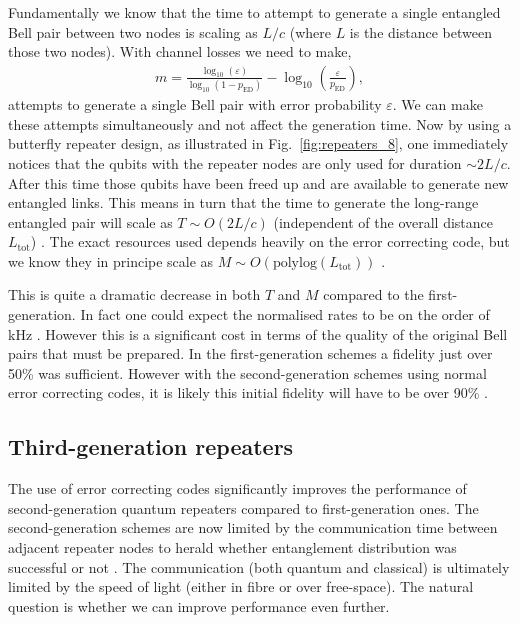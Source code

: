 Fundamentally we know that the time to attempt to generate a single entangled Bell pair between two nodes is scaling as $L/c$ (where $L$ is the distance between those two nodes). With channel losses we need to make,
\begin{align}
m=\frac{\log_{10} (\varepsilon)}{\log_{10} (1-p_\mathrm{ED})} - \log_{10} \left(\frac{\varepsilon}{p_\mathrm{ED}}\right),
\end{align}
attempts to generate a single Bell pair with error probability $\varepsilon$. We can make these attempts simultaneously and not affect the generation time. Now by using a butterfly repeater design, as illustrated in Fig.~\ref{fig:repeaters_8}, one immediately notices that the qubits with the repeater nodes are only used for duration $\sim 2 L/c$. After this time those qubits have been freed up and are available to generate new entangled links. This means in turn that the time to generate the long-range entangled pair will scale as \mbox{$T\sim O(2L/c)$} (independent of the overall distance $L_\mathrm{tot}$) \cite{bib:jiang09, bib:munro10, bib:Muralidharan2016}. The exact resources used depends heavily on the error correcting code, but we know they in principe scale as \mbox{$M \sim O(\mathrm{polylog}(L_\mathrm{tot}))$} \cite{bib:Muralidharan2016}.

This is quite a dramatic decrease in both $T$ and $M$ compared to the first-generation. In fact one could expect the normalised rates to be on the order of kHz \cite{bib:munro10}. However this is a significant cost in terms of the quality of the original Bell pairs that must be prepared. In the first-generation schemes a fidelity just over 50\% was sufficient. However with the second-generation schemes using normal error correcting codes, it is likely this initial fidelity will have to be over 90\% \cite{bib:jiang09, bib:munro10}. 

\subsection{Third-generation repeaters}

The use of error correcting codes significantly improves the performance of second-generation quantum repeaters compared to first-generation ones. The second-generation schemes are now limited by the communication time between adjacent repeater nodes to herald whether entanglement distribution was successful or not \cite{bib:munro10, bib:munro12}. The communication (both quantum and classical) is ultimately limited by the speed of light (either in fibre or over free-space). The natural question is whether we can improve performance even further.

